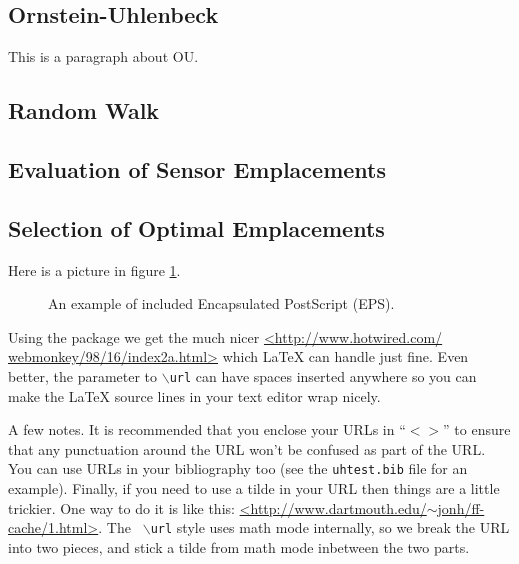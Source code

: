 \subsection{Ornstein-Uhlenbeck}
This is a paragraph about OU.
\subsection{Random Walk}
\subsection{Evaluation of Sensor Emplacements}
\subsection{Selection of Optimal Emplacements}


Here is a picture in figure \ref{fig:example-1}.

\begin{figure}[htbp]
  \centering
  \caption{An example of included Encapsulated PostScript (EPS).}
  \label{fig:example-1}
\end{figure}

Using the package we get the much nicer \url{<http://www.hotwired.com/
webmonkey/98/16/index2a.html>} which LaTeX can handle just fine. Even better,
the parameter to {\tt $\backslash$url} can have spaces inserted anywhere so you
can make the LaTeX source lines in your text editor wrap nicely.

A few notes. It is recommended that you enclose your URLs in ``$<>$'' to ensure
that any punctuation around the URL won't be confused as part of the URL. You
can use URLs in your bibliography too (see the {\tt uhtest.bib} file for an
example). Finally, if you need to use a tilde in your URL then things are a
little trickier. One way to do it is like this:
\url{<http://www.dartmouth.edu/}$\sim$\url{jonh/ff-cache/1.html>}. The {\tt
$\backslash$url} style uses math mode internally, so we break the URL into two
pieces, and stick a tilde from math mode inbetween the two parts.


